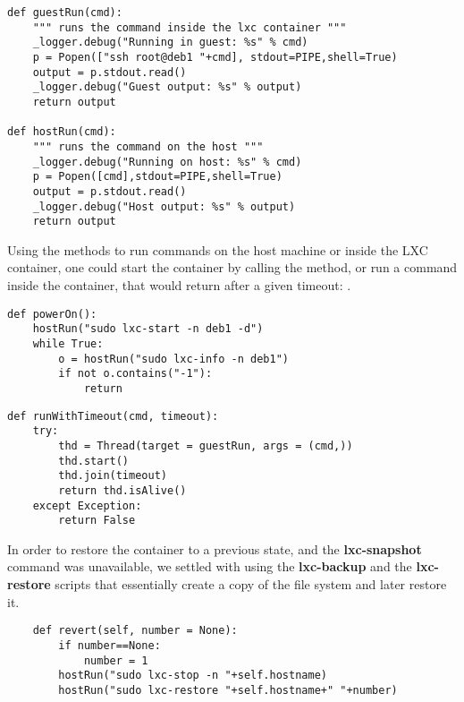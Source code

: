 \lstset{caption=Running Commands,language=python,label=lst:lxc-commands}
\begin{lstlisting}
def guestRun(cmd):
    """ runs the command inside the lxc container """
    _logger.debug("Running in guest: %s" % cmd)
    p = Popen(["ssh root@deb1 "+cmd], stdout=PIPE,shell=True)
    output = p.stdout.read()
    _logger.debug("Guest output: %s" % output)
    return output

def hostRun(cmd):
    """ runs the command on the host """
    _logger.debug("Running on host: %s" % cmd)
    p = Popen([cmd],stdout=PIPE,shell=True)
    output = p.stdout.read()
    _logger.debug("Host output: %s" % output)
    return output
\end{lstlisting}

Using the methods to run commands on the host machine or inside the 
LXC container, one could start the container by calling the 
 method, or run a command inside the container,
that would return after a given timeout: .

\lstset{caption=Method Called to Power on the Container,language=python,label=lst:lxc-poweron}
\begin{lstlisting}
def powerOn():
    hostRun("sudo lxc-start -n deb1 -d")
    while True:
        o = hostRun("sudo lxc-info -n deb1")
        if not o.contains("-1"):
            return
\end{lstlisting}


\lstset{caption=Method That Runs a Command Inside the Container,language=python,label=lst:lxc-runtimeout}
\begin{lstlisting}
def runWithTimeout(cmd, timeout):
    try:
        thd = Thread(target = guestRun, args = (cmd,))
        thd.start()
        thd.join(timeout)
        return thd.isAlive()
    except Exception:
        return False
\end{lstlisting}


In order to restore the container to a previous state, and the {\bf lxc-snapshot} 
command was unavailable, we settled with using the \textbf{lxc-backup} and 
the \textbf{lxc-restore} scripts that essentially create a
copy of the file system and later restore it.

\lstset{caption=Restoring the Container to a Previous State, language=python, label=lst:lxc-revert}
\begin{lstlisting}
    def revert(self, number = None):
        if number==None:
            number = 1
        hostRun("sudo lxc-stop -n "+self.hostname)
        hostRun("sudo lxc-restore "+self.hostname+" "+number)
\end{lstlisting}

